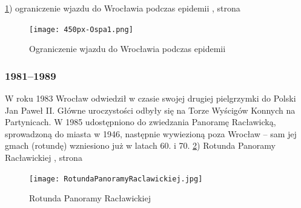 \documentclass{article}
\begin{document}
\newline\ref{fig:ospa}) ograniczenie wjazdu do Wrocławia podczas epidemii , strona \pageref{fig:ospa}
\begin{figure}[h!]
\centering
\texttt{[image: 450px-Ospa1.png]}
\caption{Ograniczenie wjazdu do Wrocławia podczas epidemii}
\label{fig:ospa}
\end{figure}











\subsubsection{1981–1989}
\vspace{3mm} %
\newline W roku 1983 Wrocław odwiedził w czasie swojej drugiej pielgrzymki do Polski Jan Paweł II. Główne uroczystości odbyły się na Torze Wyścigów Konnych na Partynicach.
\vspace{3mm} %
\newline W 1985 udostępniono do zwiedzania Panoramę Racławicką, sprowadzoną do miasta w 1946, następnie wywiezioną poza Wrocław – sam jej gmach (rotundę) wzniesiono już w latach 60. i 70.
\newline\ref{fig:rotunda}) Rotunda Panoramy Racławickiej , strona \pageref{fig:rotunda}
\begin{figure}[h!]
\centering
\texttt{[image: RotundaPanoramyRaclawickiej.jpg]}
\caption{Rotunda Panoramy Racławickiej}
\label{fig:rotunda}
\end{figure}
\end{document}
